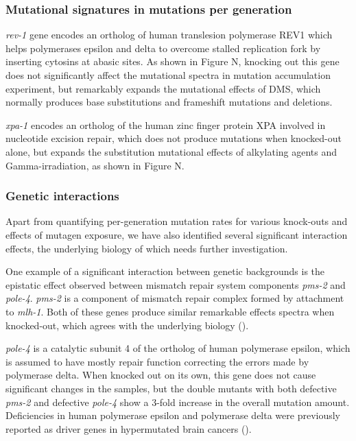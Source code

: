 \subsubsection*{Mutational signatures in mutations per generation}

\textit{rev-1} gene encodes an ortholog of human translesion polymerase REV1 which helps polymerases epsilon and delta to overcome stalled replication fork by inserting cytosins at abasic sites. As shown in Figure N, knocking out this gene does not significantly affect the mutational spectra in mutation accumulation experiment, but remarkably expands the mutational effects of DMS, which normally produces base substitutions and frameshift mutations and deletions.

\textit{xpa-1} encodes an ortholog of the human zinc finger protein XPA involved in nucleotide excision repair, which does not produce mutations when knocked-out alone, but expands the substitution mutational effects of alkylating agents and Gamma-irradiation, as shown in Figure N.





\subsubsection{Genetic interactions}

Apart from quantifying per-generation mutation rates for various knock-outs and effects of mutagen exposure, we have also identified several significant interaction effects, the underlying biology of which needs further investigation.

One example of a significant interaction between genetic backgrounds is the epistatic effect observed between mismatch repair system components \textit{pms-2} and \textit{pole-4}. \textit{pms-2} is a component of mismatch repair complex formed by attachment to \textit{mlh-1}. Both of these genes produce similar remarkable effects spectra when knocked-out, which agrees with the underlying biology (\cite{Denver}).

\textit{pole-4} is a catalytic subunit 4 of the ortholog of human polymerase epsilon, which is assumed to have mostly repair function correcting the errors made by polymerase delta. When knocked out on its own, this gene does not cause significant changes in the samples, but the double mutants with both defective \textit{pms-2} and defective \textit{pole-4} show a 3-fold increase in the overall mutation amount. Deficiencies in human polymerase epsilon and polymerase delta were previously reported as driver genes in hypermutated brain cancers (\cite{Shlien}).





